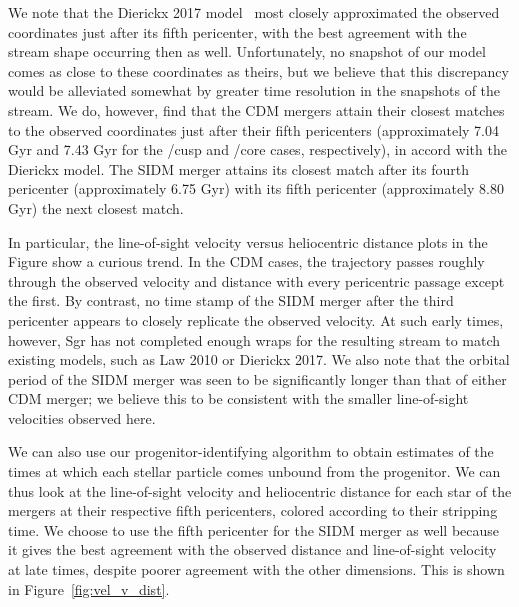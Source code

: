 We note that the Dierickx 2017 model~\cite{dierickx_predicted_2017} most
closely approximated the observed coordinates just after its fifth pericenter,
with the best agreement with the stream shape occurring then as well.
Unfortunately, no snapshot of our model comes as close to these coordinates as
theirs, but we believe that this discrepancy would be alleviated somewhat by
greater time resolution in the snapshots of the stream.  We do, however, find
that the CDM mergers attain their closest matches to the observed coordinates
just after their fifth pericenters (approximately 7.04 Gyr and 7.43 Gyr for
the /cusp and /core cases, respectively), in accord with the Dierickx model.
The SIDM merger attains its closest match after its fourth pericenter
(approximately 6.75 Gyr) with its fifth pericenter (approximately 8.80 Gyr)
the next closest match.

In particular, the line-of-sight velocity versus heliocentric distance plots
in the Figure show a curious trend.  In the CDM cases, the trajectory passes
roughly through the observed velocity and distance with every pericentric
passage except the first.  By contrast, no time stamp of the SIDM merger after
the third pericenter appears to closely replicate the observed velocity.  At
such early times, however, Sgr has not completed enough wraps for the resulting
stream to match existing models, such as Law 2010 or Dierickx 2017.  We also
note that the orbital period of the SIDM merger was seen to be significantly
longer than that of either CDM merger; we believe this to be consistent with
the smaller line-of-sight velocities observed here.

We can also use our progenitor-identifying algorithm to obtain estimates of the
times at which each stellar particle comes unbound from the progenitor. We can
thus look at the line-of-sight velocity and heliocentric distance for each star
of the mergers at their respective fifth pericenters, colored according to their
stripping time. We choose to use the fifth pericenter for the SIDM merger as
well because it gives the best agreement with the observed distance and
line-of-sight velocity at late times, despite poorer agreement with the other
dimensions.  This is shown in Figure~\ref{fig:vel_v_dist}.

